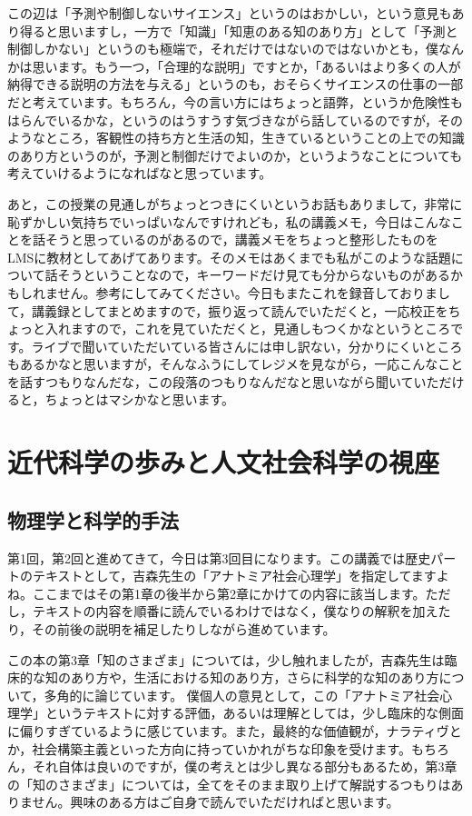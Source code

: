 \documentclass{ltjsbook}
\begin{document}
この辺は「予測や制御しないサイエンス」というのはおかしい，という意見もあり得ると思いますし，一方で「知識」「知恵のある知のあり方」として「予測と制御しかない」というのも極端で，それだけではないのではないかとも，僕なんかは思います。もう一つ，「合理的な説明」ですとか，「あるいはより多くの人が納得できる説明の方法を与える」というのも，おそらくサイエンスの仕事の一部だと考えています。もちろん，今の言い方にはちょっと語弊，というか危険性もはらんでいるかな，というのはうすうす気づきながら話しているのですが，そのようなところ，客観性の持ち方と生活の知，生きているということの上での知識のあり方というのが，予測と制御だけでよいのか，というようなことについても考えていけるようになればなと思っています。

あと，この授業の見通しがちょっとつきにくいというお話もありまして，非常に恥ずかしい気持ちでいっぱいなんですけれども，私の講義メモ，今日はこんなことを話そうと思っているのがあるので，講義メモをちょっと整形したものをLMSに教材としてあげてあります。そのメモはあくまでも私がこのような話題について話そうということなので，キーワードだけ見ても分からないものがあるかもしれません。参考にしてみてください。今日もまたこれを録音しておりまして，講義録としてまとめますので，振り返って読んでいただくと，一応校正をちょっと入れますので，これを見ていただくと，見通しもつくかなというところです。ライブで聞いていただいている皆さんには申し訳ない，分かりにくいところもあるかなと思いますが，そんなふうにしてレジメを見ながら，一応こんなことを話すつもりなんだな，この段落のつもりなんだなと思いながら聞いていただけると，ちょっとはマシかなと思います。

\section{近代科学の歩みと人文社会科学の視座}
\subsection{物理学と科学的手法}
第1回，第2回と進めてきて，今日は第3回目になります。この講義では歴史パートのテキストとして，吉森先生の「アナトミア社会心理学」\parencite{anatomia}を指定してますよね。ここまではその第1章の後半から第2章にかけての内容に該当します。ただし，テキストの内容を順番に読んでいるわけではなく，僕なりの解釈を加えたり，その前後の説明を補足したりしながら進めています。

この本の第3章「知のさまざま」については，少し触れましたが，吉森先生は臨床的な知のあり方や，生活における知のあり方，さらに科学的な知のあり方について，多角的に論じています。
僕個人の意見として，この「アナトミア社会心理学」というテキストに対する評価，あるいは理解としては，少し臨床的な側面に偏りすぎているように感じています。また，最終的な価値観が，ナラティヴとか，社会構築主義といった方向に持っていかれがちな印象を受けます。もちろん，それ自体は良いのですが，僕の考えとは少し異なる部分もあるため，第3章の「知のさまざま」については，全てをそのまま取り上げて解説するつもりはありません。興味のある方はご自身で読んでいただければと思います。
\end{document}
